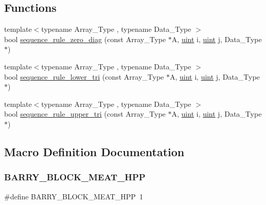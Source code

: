 \subsection*{Functions}
\begin{DoxyCompactItemize}
\item 
{\footnotesize template$<$typename Array\+\_\+\+Type , typename Data\+\_\+\+Type $>$ }\\bool \hyperlink{block-meat_8hpp_a0d46af0e4cb648e744267bc926870c56}{sequence\+\_\+rule\+\_\+zero\+\_\+diag} (const Array\+\_\+\+Type $\ast$A, \hyperlink{typedefs_8hpp_a91ad9478d81a7aaf2593e8d9c3d06a14}{uint} i, \hyperlink{typedefs_8hpp_a91ad9478d81a7aaf2593e8d9c3d06a14}{uint} j, Data\+\_\+\+Type $\ast$)
\item 
{\footnotesize template$<$typename Array\+\_\+\+Type , typename Data\+\_\+\+Type $>$ }\\bool \hyperlink{block-meat_8hpp_a1e0c9474a332f7f0feacb6c83db47e09}{sequence\+\_\+rule\+\_\+lower\+\_\+tri} (const Array\+\_\+\+Type $\ast$A, \hyperlink{typedefs_8hpp_a91ad9478d81a7aaf2593e8d9c3d06a14}{uint} i, \hyperlink{typedefs_8hpp_a91ad9478d81a7aaf2593e8d9c3d06a14}{uint} j, Data\+\_\+\+Type $\ast$)
\item 
{\footnotesize template$<$typename Array\+\_\+\+Type , typename Data\+\_\+\+Type $>$ }\\bool \hyperlink{block-meat_8hpp_af5065fcabecdb2c3eedc5f95389aadfc}{sequence\+\_\+rule\+\_\+upper\+\_\+tri} (const Array\+\_\+\+Type $\ast$A, \hyperlink{typedefs_8hpp_a91ad9478d81a7aaf2593e8d9c3d06a14}{uint} i, \hyperlink{typedefs_8hpp_a91ad9478d81a7aaf2593e8d9c3d06a14}{uint} j, Data\+\_\+\+Type $\ast$)
\end{DoxyCompactItemize}


\subsection{Macro Definition Documentation}
\mbox{\label{barry_8hpp_ad32bbe588fc2f7e5cfbfa9a737eb67a4}} 
\subsubsection{\texorpdfstring{B\+A\+R\+R\+Y\+\_\+\+B\+L\+O\+C\+K\+\_\+\+M\+E\+A\+T\+\_\+\+H\+PP}{BARRY\_BLOCK\_MEAT\_HPP}\hspace{0.1cm}{\footnotesize\ttfamily [1/2]}}
{\footnotesize\ttfamily \#define B\+A\+R\+R\+Y\+\_\+\+B\+L\+O\+C\+K\+\_\+\+M\+E\+A\+T\+\_\+\+H\+PP~1}

